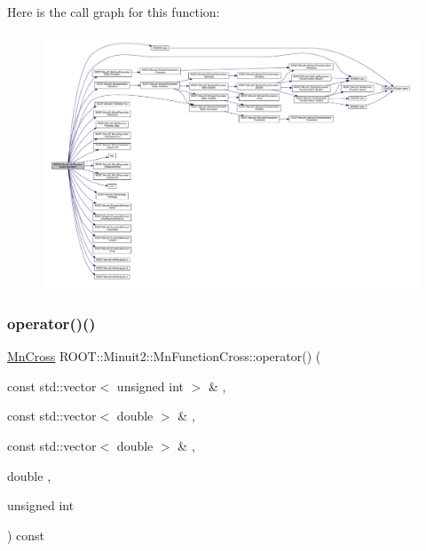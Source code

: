 Here is the call graph for this function\+:
\nopagebreak
\begin{figure}[H]
\begin{center}
\leavevmode
\includegraphics[width=350pt]{de/d46/classROOT_1_1Minuit2_1_1MnFunctionCross_ace9b7e1472f82cb23525365e5f061477_cgraph}
\end{center}
\end{figure}
\mbox{\label{classROOT_1_1Minuit2_1_1MnFunctionCross_ace9b7e1472f82cb23525365e5f061477}} 
\subsubsection{\texorpdfstring{operator()()}{operator()()}\hspace{0.1cm}{\footnotesize\ttfamily [2/3]}}
{\footnotesize\ttfamily \mbox{\hyperlink{classROOT_1_1Minuit2_1_1MnCross}{Mn\+Cross}} R\+O\+O\+T\+::\+Minuit2\+::\+Mn\+Function\+Cross\+::operator() (\begin{DoxyParamCaption}\item[{const std\+::vector$<$ unsigned int $>$ \&}]{,  }\item[{const std\+::vector$<$ double $>$ \&}]{,  }\item[{const std\+::vector$<$ double $>$ \&}]{,  }\item[{double}]{,  }\item[{unsigned int}]{ }\end{DoxyParamCaption}) const}

\mbox{\label{classROOT_1_1Minuit2_1_1MnFunctionCross_ace9b7e1472f82cb23525365e5f061477}} 
